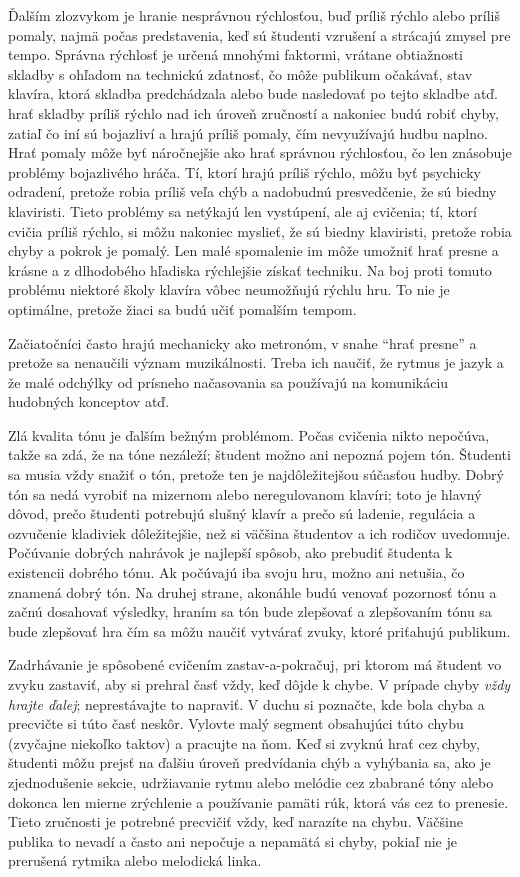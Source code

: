 \documentclass[11pt,a4paper]{book}
\begin{document}
Ďalším zlozvykom je hranie nesprávnou rýchlosťou, buď príliš rýchlo alebo príliš pomaly, najmä počas predstavenia, keď sú študenti vzrušení a strácajú zmysel pre tempo. Správna rýchlosť je určená mnohými faktormi, vrátane obtiažnosti skladby s ohľadom na technickú zdatnosť, čo môže publikum očakávať, stav klavíra, ktorá skladba predchádzala alebo bude nasledovať po tejto skladbe atď. hrať skladby príliš rýchlo nad ich úroveň zručností a nakoniec budú robiť chyby, zatiaľ čo iní sú bojazliví a hrajú príliš pomaly, čím nevyužívajú hudbu naplno. Hrať pomaly môže byť náročnejšie ako hrať správnou rýchlosťou, čo len znásobuje problémy bojazlivého hráča. Tí, ktorí hrajú príliš rýchlo, môžu byť psychicky odradení, pretože robia príliš veľa chýb a nadobudnú presvedčenie, že sú biedny klaviristi. Tieto problémy sa netýkajú len vystúpení, ale aj cvičenia; tí, ktorí cvičia príliš rýchlo, si môžu nakoniec myslieť, že sú biedny klaviristi, pretože robia chyby a pokrok je pomalý. Len malé spomalenie im môže umožniť hrať presne a krásne a z dlhodobého hľadiska rýchlejšie získať techniku. Na boj proti tomuto problému niektoré školy klavíra vôbec neumožňujú rýchlu hru. To nie je optimálne, pretože žiaci sa budú učiť pomalším tempom.

Začiatočníci často hrajú mechanicky ako metronóm, v snahe “hrať presne” a pretože sa nenaučili význam muzikálnosti. Treba ich naučiť, že rytmus je jazyk a že malé odchýlky od prísneho načasovania sa používajú na komunikáciu hudobných konceptov atď.

Zlá kvalita tónu je ďalším bežným problémom. Počas cvičenia nikto nepočúva, takže sa zdá, že na tóne nezáleží; študent možno ani nepozná pojem tón. Študenti sa musia vždy snažiť o tón, pretože ten je najdôležitejšou súčasťou hudby. Dobrý tón sa nedá vyrobiť na mizernom alebo neregulovanom klavíri; toto je hlavný dôvod, prečo študenti potrebujú slušný klavír a prečo sú ladenie, regulácia a ozvučenie kladiviek dôležitejšie, než si väčšina študentov a ich rodičov uvedomuje. Počúvanie dobrých nahrávok je najlepší spôsob, ako prebudiť študenta k existencii dobrého tónu. Ak počúvajú iba svoju hru, možno ani netušia, čo znamená dobrý tón. Na druhej strane, akonáhle budú venovať pozornosť tónu a začnú dosahovať výsledky, hraním sa tón bude zlepšovať a zlepšovaním tónu sa bude zlepšovať hra čím sa môžu naučiť vytvárať zvuky, ktoré priťahujú publikum.

Zadrhávanie je spôsobené cvičením zastav-a-pokračuj, pri ktorom má študent vo zvyku zastaviť, aby si prehral časť vždy, keď dôjde k chybe. V prípade chyby \emph{vždy hrajte ďalej}; neprestávajte to napraviť. V duchu si poznačte, kde bola chyba a precvičte si túto časť neskôr. Vylovte malý segment obsahujúci túto chybu (zvyčajne niekoľko taktov) a pracujte na ňom. Keď si zvyknú hrať cez chyby, študenti môžu prejsť na ďalšiu úroveň predvídania chýb a vyhýbania sa, ako je zjednodušenie sekcie, udržiavanie rytmu alebo melódie cez zbabrané tóny alebo dokonca len mierne zrýchlenie a používanie pamäti rúk, ktorá vás cez to prenesie. Tieto zručnosti je potrebné precvičiť vždy, keď narazíte na chybu. Väčšine publika to nevadí a často ani nepočuje a nepamätá si chyby, pokiaľ nie je prerušená rytmika alebo melodická linka.
\end{document}

